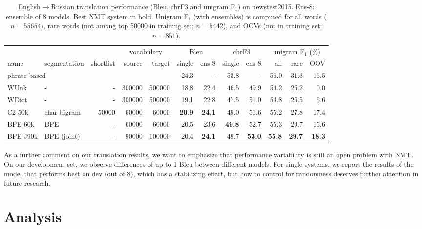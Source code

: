 \documentclass[11pt]{article}
\begin{document}
\begin{table}
\centering
\small
\setlength{\tabcolsep}{3pt}
\begin{tabular}{llrrr|rr|rr|rrr}
&&&\multicolumn{2}{c|}{vocabulary}&\multicolumn{2}{c|}{{\sc Bleu}} & \multicolumn{2}{c|}{{\sc chrF3}} & \multicolumn{3}{c}{unigram F$_1$ (\%)}\\
name & segmentation & shortlist & source & target & single & ens-8 & single & ens-8 & all & rare & OOV\\
\hline
\multicolumn{3}{l}{phrase-based \cite{haddow-EtAl:2015:WMT}} & & & 
24.3 & - & 
53.8 & - & 56.0 & 31.3 & 16.5\\ 
\hline
WUnk & - & - & \num{300000} & \num{500000} & 
18.8 & 22.4 & 
46.5 & 49.9 & 54.2 & 25.2 & 0.0\\ 
WDict & - & - & \num{300000} & \num{500000} & 
19.1 & 22.8 & 
47.5 & 51.0 & 54.8 & 26.5 & 6.6\\ 
C2-50k & char-bigram & \num{50000} & \num{60000} & \num{60000} & 
\textbf{20.9} & \textbf{24.1} &
49.0 & 51.6 & 55.2 & 27.8 & 17.4\\ 
BPE-60k & BPE & - & \num{60000} & \num{60000} &
20.5 & 23.6 &
\textbf{49.8} & 52.7 & 55.3 & 29.7 & 15.6 \\ 
BPE-J90k & BPE (joint)& - & \num{90000} & \num{100000} &
20.4 & \textbf{24.1} &
49.7 & \textbf{53.0} & \textbf{55.8} & \textbf{29.7} & \textbf{18.3}\\ 
\end{tabular}
\caption{English$\to$Russian translation performance ({\sc Bleu}, {\sc chrF3} and unigram F$_1$) on newstest2015.
Ens-8: ensemble of 8 models.
Best NMT system in bold.
Unigram F$_1$ (with ensembles) is computed for all words ($n=55654$), rare words (not among top \num{50000} in training set; $n=5442$), and OOVs (not in training set; $n=851$).}
\label{results-russian}
\end{table}

As a further comment on our translation results, we want to emphasize that performance variability is still an open problem with NMT.
On our development set, we observe differences of up to 1 {\sc Bleu} between different models.
For single systems, we report the results of the model that performs best on dev (out of 8), which has a stabilizing effect, but how to control for randomness deserves further attention in future research.

\section{Analysis}
\label{sec-analysis}
\end{document}
